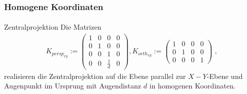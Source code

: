 \documentclass{beamer}
\begin{document}
\begin{frame}
    \frametitle{Homogene Koordinaten}
\framesubtitle{}
\begin{block}{Zentralprojektion}
Die Matrizen
\begin{align*}
K_{persp_{xy}} := \begin{pmatrix}  
1   &  0 & 0 & 0  \\
0   &  1 & 0 & 0  \\
0   &  0 & 1 & 0  \\
0   &  0 & \frac{1}{d} & 0 
\end{pmatrix} ,
K_{orth_{xy}} := \begin{pmatrix}  
1   &  0 & 0 & 0  \\
0   &  1 & 0 & 0  \\
0   &  0 & 0 & 1  
\end{pmatrix} \; ,
\end{align*}
realisieren die Zentralprojektion auf die Ebene parallel zur $X-Y$-Ebene und Augenpunkt im Ursprung mit Augendistanz $d$ in homogenen Koordinaten.
\end{block}
\end{frame}
\end{document}
